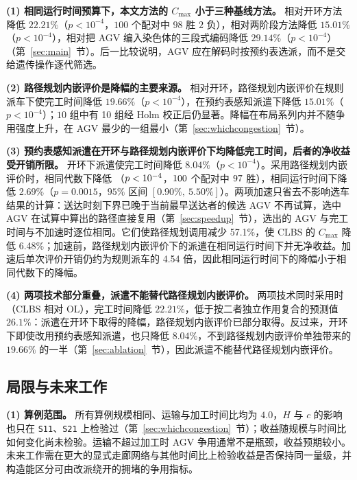 \documentclass[manuscript,screen,review]{acmart}
\newcommand{\NCases}{10}
\newcommand{\NPairs}{100}
\newcommand{\GainLoopRule}{19.66\%}      %
\newcommand{\PLoopRule}{<10^{-4}}
\newcommand{\GainLoopProbe}{15.01\%}     %
\newcommand{\PLoopProbe}{<10^{-4}}
\newcommand{\GainProbeOpen}{8.04\%}      %
\newcommand{\PProbeOpen}{<10^{-4}}
\newcommand{\GainProbeLoop}{2.69\%}      %
\newcommand{\PProbeLoop}{=0.0015}
\newcommand{\GainEndToEnd}{22.21\%}      %
\newcommand{\PEndToEnd}{<10^{-4}}
\newcommand{\WinEndToEnd}{98}
\newcommand{\LoseEndToEnd}{2}
\newcommand{\GainLyu}{29.14\%}          %
\newcommand{\PLyu}{<10^{-4}}
\newcommand{\CIProbeLoop}{$[0.90\%,\ 5.50\%]$}
\newcommand{\GainIndepProduct}{26.1\%}
\newcommand{\CellsSigLoopAdj}{10}
\newcommand{\RouteCallCut}{57.1\%}
\newcommand{\GainPrune}{6.48\%}
\newcommand{\CostMultAfter}{4.54}
\begin{document}
\textbf{(1) 相同运行时间预算下，本文方法的 $C_{\max}$ 小于三种基线方法。}
相对开环方法降低 $\GainEndToEnd$（$p\PEndToEnd$，$\NPairs$ 个配对中 $\WinEndToEnd$ 胜 $\LoseEndToEnd$ 负），相对两阶段方法降低 $\GainLoopProbe$（$p\PLoopProbe$），相对把 AGV 编入染色体的三段式编码降低 $\GainLyu$（$p\PLyu$）（第~\ref{sec:main}~节）。后一比较说明，AGV 应在解码时按预约表选派，而不是交给遗传操作逐代筛选。

\textbf{(2) 路径规划内嵌评价是降幅的主要来源。}
相对开环，路径规划内嵌评价在规则派车下使完工时间降低 $\GainLoopRule$（$p\PLoopRule$），在预约表感知派遣下降低 $\GainLoopProbe$（$p\PLoopProbe$）；$\NCases$ 组中有 \CellsSigLoopAdj{} 组经 Holm 校正后仍显著。降幅在布局系列内并不随争用强度上升，在 AGV 最少的一组最小（第~\ref{sec:whichcongestion}~节）。

\textbf{(3) 预约表感知派遣在开环与路径规划内嵌评价下均降低完工时间，后者的净收益受开销所限。}
开环下派遣使完工时间降低 $\GainProbeOpen$（$p\PProbeOpen$）。采用路径规划内嵌评价时，相同代数下降低 \SameGenGainAbs{}（$p<10^{-4}$，$100$ 个配对中 $97$ 胜），相同运行时间下降低 \GainProbeLoop{}（$p\PProbeLoop$，$95\%$ 区间 \CIProbeLoop{}）。两项加速只省去不影响选车结果的计算：送达时刻下界已晚于当前最早送达者的候选 AGV 不再试算，选中 AGV 在试算中算出的路径直接复用（第~\ref{sec:speedup}~节），选出的 AGV 与完工时间与不加速时逐位相同。它们使路径规划调用减少 \RouteCallCut{}，使 CLBS 的 $C_{\max}$ 降低 \GainPrune{}；加速前，路径规划内嵌评价下的派遣在相同运行时间下并无净收益。加速后单次评价开销仍约为规则派车的 \CostMultAfter{} 倍，因此相同运行时间下的降幅小于相同代数下的降幅。

\textbf{(4) 两项技术部分重叠，派遣不能替代路径规划内嵌评价。}
两项技术同时采用时（CLBS 相对 OL），完工时间降低 $\GainEndToEnd$，低于按二者独立作用复合的预测值 $\GainIndepProduct$：派遣在开环下取得的降幅，路径规划内嵌评价已部分取得。反过来，开环下即使改用预约表感知派遣，也只降低 $\GainProbeOpen$，不到路径规划内嵌评价单独带来的 $\GainLoopRule$ 的一半（第~\ref{sec:ablation}~节），因此派遣不能替代路径规划内嵌评价。

\subsection{局限与未来工作}
\label{sec:limitations}

\textbf{(1) 算例范围。}
所有算例规模相同、运输与加工时间比均为 $4.0$，$H$ 与 $c$ 的影响也只在 \texttt{S11}、\texttt{S21} 上检验过（第~\ref{sec:whichcongestion}~节）；收益随规模与时间比如何变化尚未检验。运输不超过加工时 AGV 争用通常不是瓶颈，收益预期较小。未来工作需在更大的显式走廊网络与其他时间比上检验收益是否保持同一量级，并构造能区分可由改派绕开的拥堵的争用指标。
\end{document}
